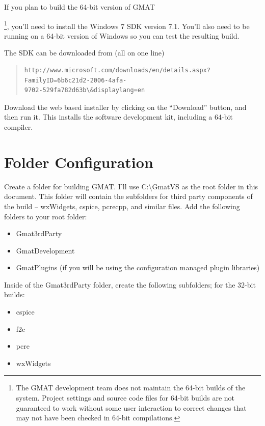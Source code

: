 \documentclass[letterpaper,10pt]{article}%
\begin{document}
If you plan to build the 64-bit version of GMAT{\footnote{The GMAT development team does not maintain the 64-bit builds of the system.  Project settings and source code files for 64-bit builds are not guaranteed to work without some user interaction to correct changes that may not have been checked in 64-bit compilations.}, you'll need to install the Windows 7 SDK version 7.1.  You'll also need to be running on a 64-bit version of Windows so you can test the resulting build.

The SDK can be downloaded from (all on one line)
\begin{quote}
\begin{verbatim}
http://www.microsoft.com/downloads/en/details.aspx?FamilyID=6b6c21d2-2006-4afa-
9702-529fa782d63b\&displaylang=en
\end{verbatim}
\end{quote}
\noindent Download the web based installer by clicking on the ``Download'' button, and then run it.  This installs the software development kit, including a 64-bit compiler.

\section{Folder Configuration}

Create a folder for building GMAT.  I'll use C:\textbackslash GmatVS as the root folder in this document.  This folder will contain the subfolders for third party components of the build -- wxWidgets, cspice, pcrecpp, and similar files.  Add the following folders to your root folder:
\begin{itemize}
\item Gmat3rdParty
\item GmatDevelopment
\item GmatPlugins (if you will be using the configuration managed plugin libraries)
\end{itemize}

\noindent Inside of the Gmat3rdParty folder, create the following subfolders; for the 32-bit builds:
\begin{itemize}
\item cspice
\item f2c
\item pcre
\item wxWidgets
\end{itemize}

}
\end{document}
